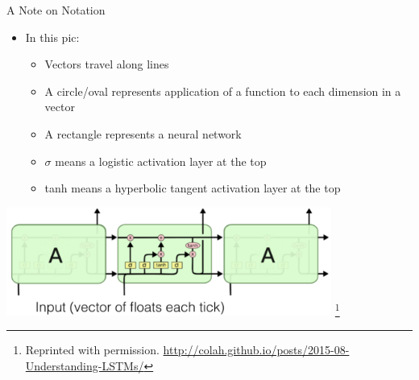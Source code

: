 \documentclass[aspectratio=169]{beamer}
\begin{document}
\begin{frame}{A Note on Notation}
\begin{itemize}
	\item In this pic:
	\begin{itemize}
	\item Vectors travel along lines
	\item A circle/oval represents application of a function to each dimension in a vector
	\item A rectangle represents a neural network
	\item $\sigma$ means a logistic activation layer at the top
	\item tanh means a hyperbolic tangent activation layer at the top
	\end{itemize}
\end{itemize}
\includegraphics[width=0.8\textwidth]{lectLSTM/LSTMNew.png}
\footnote{Reprinted with permission. \url{http://colah.github.io/posts/2015-08-Understanding-LSTMs/}}
\end{frame}
\end{document}
